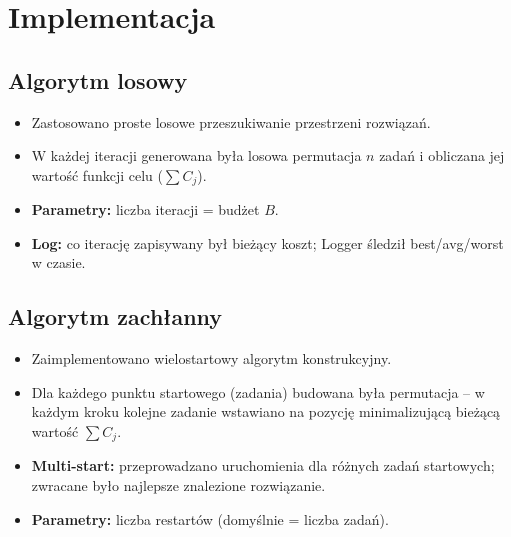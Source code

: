 \documentclass[11pt,a4paper]{article}
\begin{document}
\section{Implementacja}

\subsection{Algorytm losowy}
\label{sec:random}
\begin{itemize}
    \item Zastosowano proste losowe przeszukiwanie przestrzeni rozwiązań.
    \item W każdej iteracji generowana była losowa permutacja $n$ zadań i obliczana jej wartość funkcji celu ($\sum C_j$).
    \item \textbf{Parametry:} liczba iteracji = budżet $B$.
    \item \textbf{Log:} co iterację zapisywany był bieżący koszt; Logger śledził best/avg/worst w czasie.
\end{itemize}

\subsection{Algorytm zachłanny}
\label{sec:greedy}
\begin{itemize}
    \item Zaimplementowano wielostartowy algorytm konstrukcyjny.
    \item Dla każdego punktu startowego (zadania) budowana była permutacja -- w każdym kroku kolejne zadanie wstawiano na pozycję minimalizującą bieżącą wartość $\sum C_j$.
    \item \textbf{Multi-start:} przeprowadzano uruchomienia dla różnych zadań startowych; zwracane było najlepsze znalezione rozwiązanie.
    \item \textbf{Parametry:} liczba restartów (domyślnie = liczba zadań).
\end{itemize}
\end{document}
